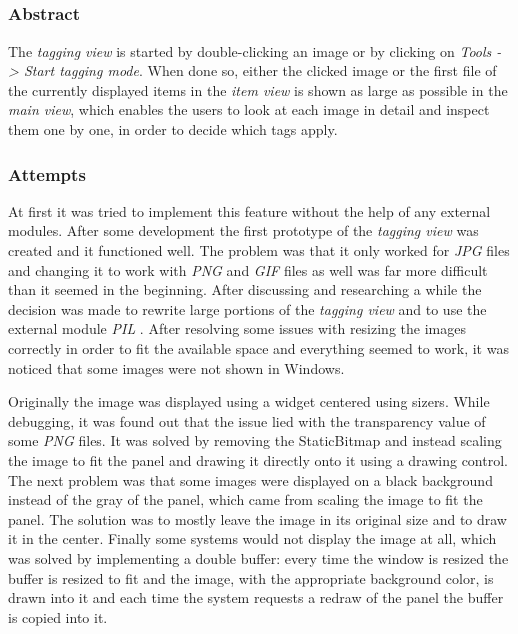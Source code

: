 \subsection{}
\def\kapitelautor{Christoph Führer, Clemens Stadlbauer, Erik Ritschl}

\subsubsection{Abstract}

The  \emph{tagging view} is started by double-clicking an image or by clicking on \emph{Tools -> Start tagging mode}. When done so, either the clicked image or the first file of the currently displayed items in the \emph{item view} is shown as large as possible in the \emph{main view}, which enables the users to look at each image in detail and inspect them one by one, in order to decide which tags apply.

\subsubsection{Attempts}

At first it was tried to implement this feature without the help of any external modules. After some development the first prototype of the \emph{tagging view} was created and it functioned well. The problem was that it only worked for \emph{JPG} files and changing it to work with \emph{PNG} and \emph{GIF} files as well was far more difficult than it seemed in the beginning. After discussing and researching a while the decision was made to rewrite large portions of the \emph{tagging view} and to use the external module \emph{PIL} \cite{PIL}. After resolving some issues with resizing the images correctly in order to fit the available space and everything seemed to work, it was noticed that some images were not shown in Windows.

Originally the image was displayed using a  widget centered
using sizers. While debugging, it was found out that the issue lied with the transparency value of some \emph{PNG} files. It was solved by removing the StaticBitmap and instead scaling the
image to fit the panel and drawing it directly onto it using a drawing control. The
next problem was that some images were displayed on a black background instead
of the gray of the panel, which came from scaling the image to fit the panel.
The solution was to mostly leave the image in its original size and to draw it in the center. Finally
some systems would not display the image at all, which was solved by
implementing a double buffer: every time the window is resized the buffer is
resized to fit and the image, with the appropriate background color, is drawn
into it and each time the system requests a redraw of the panel the buffer is
copied into it.

